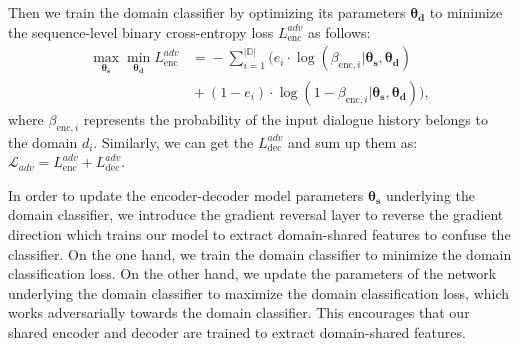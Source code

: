 \documentclass[11pt,a4paper]{article}
\begin{document}
Then we train the domain classifier by optimizing its parameters $\boldsymbol{\theta_{d}}$ to minimize the sequence-level binary cross-entropy loss $L_\text{enc}^{adv}$ as follows:
\begin{equation}
\begin{aligned}
\mathop{\max}_{\boldsymbol{\theta_{s}}} \mathop{\min}_{\boldsymbol{\theta_{d}}} L_\text{enc}^{adv} &\!=\!  -\sum_{i=1}^{\mathbb{|D|}} (e_{i} \cdot \log (\beta_{\text{enc}, i} | \boldsymbol{\theta_{s}},\boldsymbol{\theta_{d}}) \\ &\!+\! (1 - e_{i}) \cdot \log (1 - \beta_{\text{enc}, i}|\boldsymbol{\theta_{s}},\boldsymbol{\theta_{d}})), 
\end{aligned}
\end{equation}
where $\beta_{\text{enc}, i}$ represents the probability of the input dialogue history belongs to the domain $d_i$. Similarly, we can get the $L_\text{dec}^{adv}$ and sum up them as: $\mathcal{L}_{adv} = L_\text{enc}^{adv} + L_\text{dec}^{adv}$.

In order to update the encoder-decoder model parameters $\boldsymbol{\theta_{s}}$ underlying the domain classifier, we introduce the gradient reversal layer to reverse the gradient direction which trains our model to extract domain-shared features to confuse the classifier. On the one hand, we train the domain classifier to minimize the domain classification loss. On the other hand, we update the parameters of the network underlying the domain classifier to maximize the domain classification loss, which works adversarially towards the domain classifier. This encourages that our shared encoder and decoder are trained to extract domain-shared features. 
\end{document}
